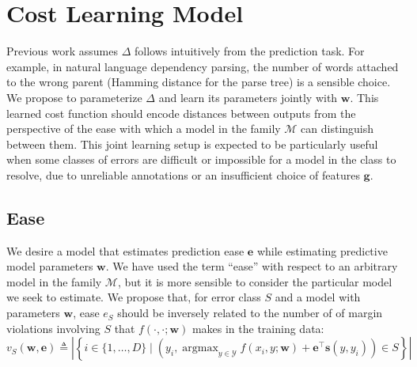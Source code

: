 \documentclass{article} %
\DeclareMathOperator*{\argmax}{argmax}
\begin{document}
\section{Cost Learning Model}
\label{costLearningModel}


Previous work assumes $\Delta$ follows intuitively from the prediction
task.  For example, in natural language dependency parsing, the number
of words attached to the wrong parent (Hamming distance for the parse
tree) is a sensible choice.  
We propose to parameterize $\Delta$ and
learn its parameters jointly with $\mathbf{w}$.  This learned cost
function should encode distances between outputs from the perspective
of the ease with which a model in the family $\mathcal{M}$
can distinguish between them.
This joint learning setup is expected to be particularly useful when
some classes of errors are difficult or impossible for a model in the
class to resolve, due to unreliable annotations or an insufficient
choice of features $\mathbf{g}$.


\subsection{Ease}

We desire a model that estimates prediction ease $\mathbf{e}$ while
estimating
predictive model parameters $\mathbf{w}$. 
We have used the term ``ease''
with respect to an arbitrary model in the family $\mathcal{M}$, but it
is more sensible to consider the particular model we seek to
estimate.  We propose that, for error class $S$ and a model with
parameters $\mathbf{w}$, ease $e_S$ should be inversely related to the
number of
of margin violations involving $S$ that $f(\cdot, \cdot; \mathbf{w})$ makes in the
training data:
\begin{equation}
v_S (\mathbf{w}, \mathbf{e}) \triangleq \left|\left\{ i  \in \{1,\ldots, D\} \mid \left(y_i, \textstyle \argmax_{y \in \mathcal{Y}} f(x_i, y ; \mathbf{w}) +
\mathbf{e}^\top \mathbf{s}(y, y_i)\right) \in S\right\}\right| \label{eq:set}
\end{equation}
\end{document}
